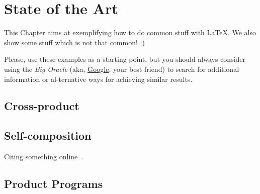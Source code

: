 
%

\makeatletter
\newcommand{\ntifpkgloaded}{%
  \@ifpackageloaded%
}
\makeatother


\chapter{State of the Art}
\label{cha:state_of_the_art}

This Chapter aims at exemplifying how to do common stuff with \LaTeX. We also show some stuff which is not that common! ;)

Please, use these examples as a starting point, but you should always consider using the \emph{Big Oracle} (aka, \href{http://www.google.com}{Google}, your best friend) to search for additional information or al-ternative ways for achieving similar results.

\section{Cross-product} 
\label{sec:cross_product}



\section{Self-composition} 
\label{sec:self_composition}

Citing something online~\cite{wiki:shuntingyard,flex,bison}.



\section{Product Programs} 
\label{sec:product_programs}




